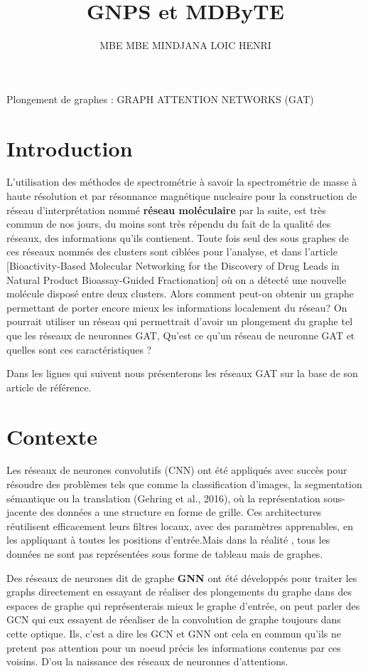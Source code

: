 \documentclass[12pt,a4paper]{report}
\author{MBE MBE MINDJANA LOIC HENRI}
\title{GNPS et MDByTE}
\begin{document}
    
    \pagecouverture
    {Plongement de graphes : GRAPH ATTENTION NETWORKS (GAT)}
    {}
    \tableofcontents
    \vspace{20cm}
    
    \section{Introduction}
    L'utilisation des méthodes de spectrométrie à savoir la spectrométrie de masse à haute résolution et par résonnance magnétique nucleaire pour la construction de réseau d'interprétation nommé \textbf{réseau moléculaire} par la suite, est très commun de nos jours, du moins sont très répendu du fait de la qualité des réseaux, des informations qu'ils contienent. Toute fois seul des sous graphes de ces réseaux nommés des clusters sont ciblées pour l'analyse, et dans l'article [Bioactivity-Based Molecular Networking for the Discovery of Drug Leads in Natural Product Bioassay-Guided Fractionation] où on a détecté une nouvelle molécule disposé entre deux clusters. Alors comment peut-on obtenir un graphe permettant de porter encore mieux les informations localement du réseau? On pourrait utiliser un réseau qui permettrait d'avoir un plongement du graphe tel que les réseaux de neuronnes GAT, Qu'est ce qu'un réseau de neuronne GAT et quelles sont ces caractéristiques ? 

    Dans les lignes qui suivent nous présenterons les réseaux GAT sur la base de son article de référence.

    \section{Contexte}
    Les réseaux de neurones convolutifs (CNN) ont été appliqués avec succès pour résoudre des problèmes tels que comme la classification d'images, la segmentation sémantique ou la translation (Gehring et al., 2016), où la représentation sous-jacente des données a une structure en forme de grille. Ces architectures réutilisent efficacement leurs filtres locaux, avec des paramètres apprenables, en les appliquant à toutes les positions d'entrée.Mais dans la réalité , tous les données ne sont pas représentées sous forme de tableau mais de graphes. 
    
    Des réseaux de neurones dit de graphe \textbf{GNN} ont été développés pour traiter les graphs directement en essayant de réaliser des plongements du graphe dans des espaces de graphe qui représenterais mieux le graphe d'entrée, on peut parler des GCN qui eux essayent de réealiser de la convolution de graphe toujours dans cette optique. Ils, c'est a dire les GCN et GNN ont cela en commun qu'ils ne pretent pas attention pour un noeud précis les informations contenus par ces voisins. D'ou la naissance des réseaux de neuronnes d'attentions.
\end{document}
